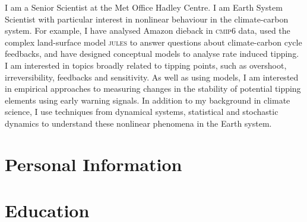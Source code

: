 \documentclass{cvjc}
\begin{document}

I am a Senior Scientist at the Met Office Hadley Centre. I am Earth System Scientist with particular interest in
nonlinear behaviour in the climate-carbon system. For example, I have
analysed Amazon dieback in \textsc{cmip6} data, used the complex
land-surface model \textsc{jules} to answer questions about
climate-carbon cycle feedbacks, and have designed conceptual models to
analyse rate induced tipping. I am interested in topics broadly
related to tipping points, such as overshoot, irreversibility,
feedbacks and sensitivity. As well as using models, I am interested in
empirical approaches to measuring changes in the stability of
potential tipping elements using early warning signals.  In addition
to my background in climate science, I use techniques from dynamical
systems, statistical and stochastic dynamics to understand these
nonlinear phenomena in the Earth system.

\section{Personal Information}
\begin{contact}
\end{contact}

\section{Education}
\begin{events}
\end{events}
\end{document}
